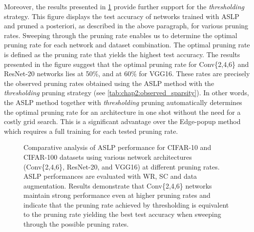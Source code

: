 Moreover, the results presented in \cref{fig:chap2:sparsity_impact} provide
further support for the \textit{thresholding} strategy. This figure displays the
test accuracy of networks trained with \ac{ASLP} and pruned a posteriori, as
described in the above paragraph, for various pruning rates. Sweeping through
the pruning rate enables us to determine the optimal pruning rate for each
network and dataset combination. The optimal pruning rate is defined as the
pruning rate that yields the highest test accuracy. The results presented in the
figure suggest that the optimal pruning rate for Conv\{2,4,6\} and ResNet-20
networks lies at 50\%, and at 60\% for VGG16. These rates are precisely the
observed pruning rates obtained using the \ac{ASLP} method with the
\emph{thresholding} pruning strategy (see \cref{tab:chap2:observed_sparsity}).
In other words, the \ac{ASLP} method together with \emph{thresholding} pruning
automatically determines the optimal pruning rate for an architecture in one shot
without the need for a costly grid search. This is a significant advantage over
the Edge-popup method \cite{DBLP:conf/cvpr/RamanujanWKFR20} which requires a
full training for each tested pruning rate.\\

\begin{figure}[htbp]
  \centering
    \caption{Comparative analysis of \ac{ASLP} performance for CIFAR-10 and CIFAR-100
    datasets using various network architectures (Conv\{2,4,6\}, ResNet-20, and
    VGG16) at different pruning rates. \ac{ASLP} performances are evaluated with
    \ac{WR}, \ac{SC} and data augmentation. Results demonstrate that
    Conv\{2,4,6\} networks maintain strong performance even at higher pruning
    rates and indicate that the pruning rate achieved by thresholding is
    equivalent to the pruning rate yielding the best test accuracy when sweeping
    through the possible pruning rates.}
  \label{fig:chap2:sparsity_impact}
\end{figure}


